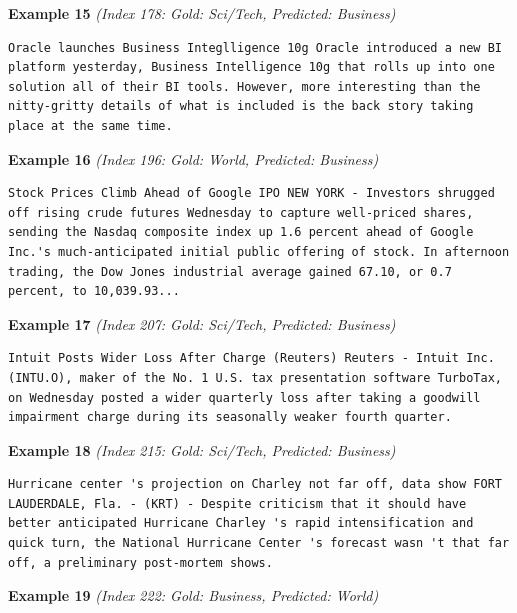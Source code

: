 \noindent
\textbf{Example 15} \quad \textit{(Index 178: Gold: Sci/Tech, Predicted: Business)}

\begin{Verbatim}[breaklines=true,breakanywhere=true,fontsize=\small]
Oracle launches Business Integlligence 10g Oracle introduced a new BI platform yesterday, Business Intelligence 10g that rolls up into one solution all of their BI tools. However, more interesting than the nitty-gritty details of what is included is the back story taking place at the same time.
\end{Verbatim}

\noindent
\textbf{Example 16} \quad \textit{(Index 196: Gold: World, Predicted: Business)}

\begin{Verbatim}[breaklines=true,breakanywhere=true,fontsize=\small]
Stock Prices Climb Ahead of Google IPO NEW YORK - Investors shrugged off rising crude futures Wednesday to capture well-priced shares, sending the Nasdaq composite index up 1.6 percent ahead of Google Inc.'s much-anticipated initial public offering of stock. In afternoon trading, the Dow Jones industrial average gained 67.10, or 0.7 percent, to 10,039.93...
\end{Verbatim}

\noindent
\textbf{Example 17} \quad \textit{(Index 207: Gold: Sci/Tech, Predicted: Business)}

\begin{Verbatim}[breaklines=true,breakanywhere=true,fontsize=\small]
Intuit Posts Wider Loss After Charge (Reuters) Reuters - Intuit Inc. (INTU.O), maker of the No. 1 U.S. tax presentation software TurboTax, on Wednesday posted a wider quarterly loss after taking a goodwill impairment charge during its seasonally weaker fourth quarter.
\end{Verbatim}

\noindent
\textbf{Example 18} \quad \textit{(Index 215: Gold: Sci/Tech, Predicted: Business)}

\begin{Verbatim}[breaklines=true,breakanywhere=true,fontsize=\small]
Hurricane center 's projection on Charley not far off, data show FORT LAUDERDALE, Fla. - (KRT) - Despite criticism that it should have better anticipated Hurricane Charley 's rapid intensification and quick turn, the National Hurricane Center 's forecast wasn 't that far off, a preliminary post-mortem shows.
\end{Verbatim}

\noindent
\textbf{Example 19} \quad \textit{(Index 222: Gold: Business, Predicted: World)}

